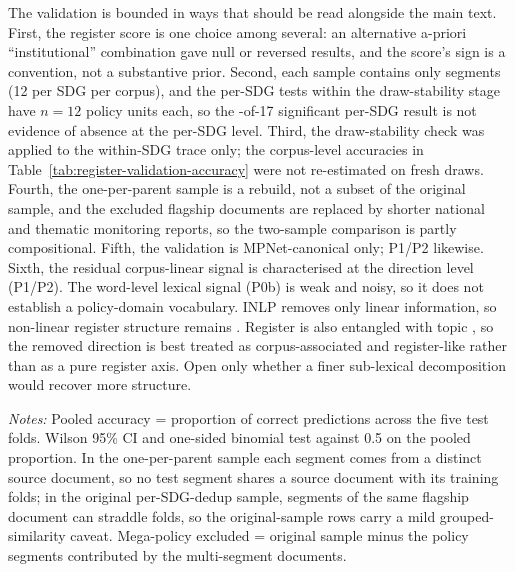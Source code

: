 \documentclass[12pt,a4paper]{article}
\begin{document}
The validation is bounded in ways that should be read alongside the main text. First, the register score is one choice among several: an alternative a-priori ``institutional'' combination gave null or reversed results, and the score's sign is a convention, not a substantive prior. Second, each sample contains only \RegValSampleN{} segments (12 per SDG per corpus), and the per-SDG tests within the draw-stability stage have $n = 12$ policy units each, so the \RegValPerSdgSig{}-of-17 significant per-SDG result is not evidence of absence at the per-SDG level. Third, the draw-stability check was applied to the within-SDG trace only; the corpus-level accuracies in Table~\ref{tab:register-validation-accuracy} were not re-estimated on fresh draws. Fourth, the one-per-parent sample is a rebuild, not a subset of the original sample, and the excluded flagship documents are replaced by shorter national and thematic monitoring reports, so the two-sample comparison is partly compositional. Fifth, the validation is MPNet-canonical only; P1/P2 likewise. Sixth, the residual corpus-linear signal is characterised at the direction level (P1/P2). The word-level lexical signal (P0b) is weak and noisy, so it does not establish a policy-domain vocabulary. INLP removes only linear information, so non-linear register structure remains \parencite{Ravfogel2020INLP, bolukbasi2016man, elazar2021amnesic, gonen2019lipstick}. Register is also entangled with topic \parencite{Grieve2025}, so the removed direction is best treated as corpus-associated and register-like rather than as a pure register axis. Open only whether a finer sub-lexical decomposition would recover more structure.

\begin{table}[ht]
\centering
\small
\caption{Corpus discrimination accuracy (research vs.\ policy, 5-fold logistic regression) before and after INLP register removal.}
\label{tab:register-validation-accuracy}
\resizebox{\textwidth}{!}{}
\par\smallskip\footnotesize\emph{Notes:} Pooled accuracy = proportion of correct predictions across the five test folds. Wilson 95\% CI and one-sided binomial test against 0.5 on the pooled proportion. In the one-per-parent sample each segment comes from a distinct source document, so no test segment shares a source document with its training folds; in the original per-SDG-dedup sample, segments of the same flagship document can straddle folds, so the original-sample rows carry a mild grouped-similarity caveat. Mega-policy excluded = original sample minus the \RegValMultiParentUnits{} policy segments contributed by the \RegValMegaDocs{} multi-segment documents.\par
\end{table}
\end{document}

